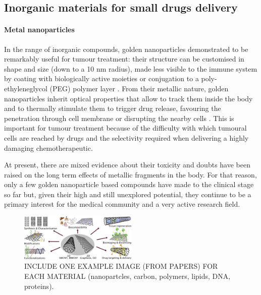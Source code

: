 \subsection{Inorganic materials for small drugs delivery}

\paragraph{Metal nanoparticles} In the range of inorganic compounds, golden nanoparticles demonstrated to be remarkably useful for tumour treatment: their structure can be customised in shape and size (down to a 10 nm radius), made less visible to the immune system by coating with biologically active moieties or conjugation to a poly-ethyleneglycol (PEG) polymer layer \cite{Singh2018}. From their metallic nature, golden nanoparticles inherit optical properties that allow to track them inside the body and to thermally stimulate them to trigger drug release, favouring the penetration through cell membrane or disrupting the nearby cells \cite{Boisselier2009}. This is important for tumour treatment because of the difficulty with which tumoural cells are reached by drugs and the selectivity required when delivering a highly damaging chemotherapeutic.

At present, there are mixed evidence about their toxicity \cite{Boisselier2009} and doubts have been raised on the long term effects of metallic fragments in the body. For that reason, only a few golden nanoparticle based compounds have made to the clinical stage so far \cite{Singh2018} but, given their high and still unexplored potential, they continue to be a primary interest for the medical community and a very active research field.

\begin{figure}
\begin{center}
\includegraphics[width = 0.5\textwidth]{1introduction/pics/carbon_review.jpg}
\vspace{0.2cm}
\caption[Materials for drug delivery vehicles]{INCLUDE ONE EXAMPLE IMAGE (FROM PAPERS) FOR EACH MATERIAL (nanopartcles, carbon, polymers, lipids, DNA, proteins).} \label{fig:vehicles}
\end{center}
\end{figure}

